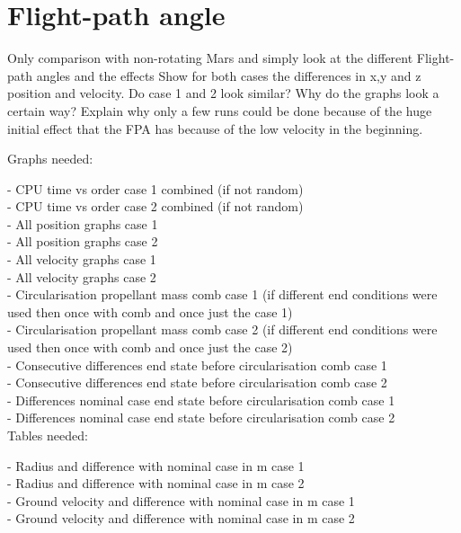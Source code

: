 \section{Flight-path angle}
\label{sec:flightPathAngle}

Only comparison with non-rotating Mars and simply look at the different Flight-path angles and the effects
Show for both cases the differences in x,y and z position and velocity. Do case 1 and 2 look similar? Why do the graphs look a certain way?
Explain why only a few runs could be done because of the huge initial effect that the FPA has because of the low velocity in the beginning.

Graphs needed:

- CPU time vs order case 1 combined (if not random) \\
- CPU time vs order case 2 combined (if not random) \\
- All position graphs case 1 \\
- All position graphs case 2 \\
- All velocity graphs case 1 \\
- All velocity graphs case 2 \\

- Circularisation propellant mass comb case 1 (if different end conditions were used then once with comb and once just the case 1) \\
- Circularisation propellant mass comb case 2 (if different end conditions were used then once with comb and once just the case 2) \\
- Consecutive differences end state before circularisation comb case 1 \\
- Consecutive differences end state before circularisation comb case 2 \\
- Differences nominal case end state before circularisation comb case 1 \\
- Differences nominal case end state before circularisation comb case 2 \\


Tables needed:

- Radius and difference with nominal case in m case 1 \\
- Radius and difference with nominal case in m case 2 \\
- Ground velocity and difference with nominal case in m case 1 \\
- Ground velocity and difference with nominal case in m case 2 \\

